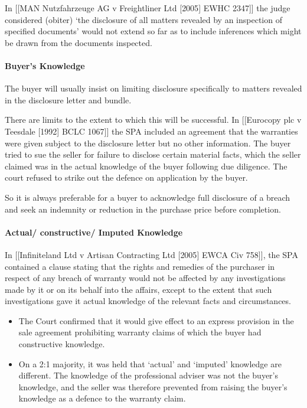\documentclass[
]{article}
\providecommand{\tightlist}{%
  \setlength{\itemsep}{0pt}\setlength{\parskip}{0pt}}
\begin{document}
In {[}{[}MAN Nutzfahrzeuge AG v Freightliner Ltd {[}2005{]} EWHC
2347{]}{]} the judge considered (obiter) `the disclosure of all matters
revealed by an inspection of specified documents' would not extend so
far as to include inferences which might be drawn from the documents
inspected.

\hypertarget{buyers-knowledge}{%
\paragraph{Buyer's Knowledge}\label{buyers-knowledge}}

The buyer will usually insist on limiting disclosure specifically to
matters revealed in the disclosure letter and bundle.

There are limits to the extent to which this will be successful. In
{[}{[}Eurocopy plc v Teesdale {[}1992{]} BCLC 1067{]}{]} the SPA
included an agreement that the warranties were given subject to the
disclosure letter but no other information. The buyer tried to sue the
seller for failure to disclose certain material facts, which the seller
claimed was in the actual knowledge of the buyer following due
diligence. The court refused to strike out the defence on application by
the buyer.

So it is always preferable for a buyer to acknowledge full disclosure of
a breach and seek an indemnity or reduction in the purchase price before
completion.

\hypertarget{actual-constructive-imputed-knowledge}{%
\paragraph{Actual/ constructive/ Imputed
Knowledge}\label{actual-constructive-imputed-knowledge}}

In {[}{[}Infiniteland Ltd v Artisan Contracting Ltd {[}2005{]} EWCA Civ
758{]}{]}, the SPA contained a clause stating that the rights and
remedies of the purchaser in respect of any breach of warranty would not
be affected by any investigations made by it or on its behalf into the
affairs, except to the extent that such investigations gave it actual
knowledge of the relevant facts and circumstances.

\begin{itemize}
\tightlist
\item
  The Court confirmed that it would give effect to an express provision
  in the sale agreement prohibiting warranty claims of which the buyer
  had constructive knowledge.
\item
  On a 2:1 majority, it was held that `actual' and `imputed' knowledge
  are different. The knowledge of the professional adviser was not the
  buyer's knowledge, and the seller was therefore prevented from raising
  the buyer's knowledge as a defence to the warranty claim.
\end{itemize}
\end{document}
